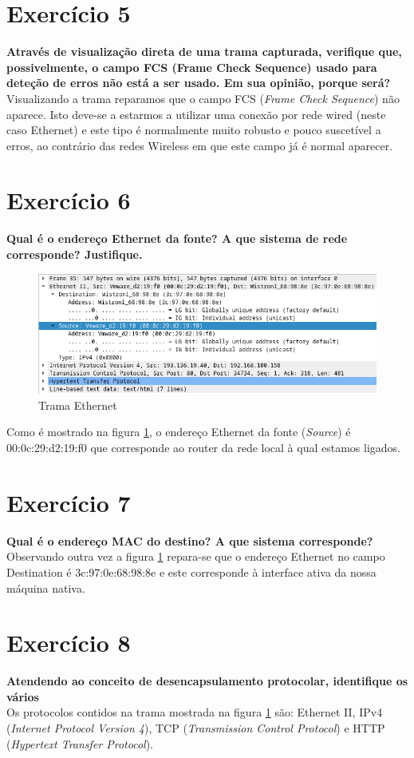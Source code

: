 \documentclass[a4paper]{report}
\begin{document}
\section{Exercício 5}
\textbf{Através de visualização direta de uma trama capturada, verifique que,
possivelmente, o campo FCS (Frame Check Sequence) usado para deteção de erros
não está a ser usado. Em sua opinião, porque será?}\\
Visualizando a trama reparamos que o campo FCS (\textit{Frame Check Sequence})
não aparece. Isto deve-se a estarmos a utilizar uma conexão por rede wired
(neste caso Ethernet) e este tipo é normalmente muito robusto e pouco suscetível
a erros, ao contrário das redes Wireless em que este campo já é normal aparecer.

\section{Exercício 6}
\textbf{Qual é o endereço Ethernet da fonte? A que sistema de rede corresponde?
Justifique.}

\begin{figure}[H]
    \centering 
    \includegraphics[width=\textwidth]{images/678.png}
    \caption{Trama Ethernet}
    \label{fig:678}
\end{figure}
Como é mostrado na figura \ref{fig:678}, o endereço Ethernet da fonte
(\textit{Source}) é 00:0c:29:d2:19:f0 que corresponde ao router da rede local
à qual estamos ligados.

\section{Exercício 7}
\textbf{Qual é o endereço MAC do destino? A que sistema corresponde?}\\
Observando outra vez a figura \ref{fig:678} repara-se que o endereço Ethernet
no campo Destination é 3c:97:0e:68:98:8e e este corresponde à interface ativa da
nossa máquina nativa.

\section{Exercício 8}
\textbf{Atendendo ao conceito de desencapsulamento protocolar, identifique os
vários}\\
Os protocolos contidos na trama mostrada na figura \ref{fig:678} são: Ethernet
II, IPv4 (\textit{Internet Protocol Version 4}), TCP (\textit{Transmission
Control Protocol}) e HTTP (\textit{Hypertext Transfer Protocol}).
\end{document}

